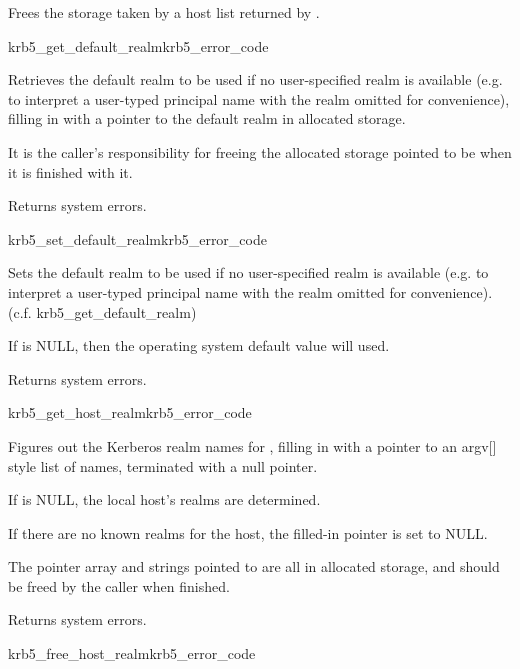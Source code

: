 Frees the storage taken by a host list returned by .

\begin{funcdecl}{krb5_get_default_realm}{krb5_error_code}{\funcin}
\funcout
{}
\end{funcdecl}

Retrieves the default realm to be used if no user-specified realm is
available (e.g. to interpret a user-typed principal name with the
realm omitted for convenience), filling in  with a
pointer to the default realm in allocated storage.

It is the caller's responsibility for freeing the allocated storage
pointed to be  when it is finished with it.

Returns system errors.

\begin{funcdecl}{krb5_set_default_realm}{krb5_error_code}{\funcin}
\end{funcdecl}

Sets the default realm to be used if no user-specified realm is
available (e.g. to interpret a user-typed principal name with the
realm omitted for convenience). (c.f. krb5_get_default_realm)

If  is NULL, then the operating system default value
will used.

Returns system errors.

\begin{funcdecl}{krb5_get_host_realm}{krb5_error_code}{\funcin}
\funcout
{}
\end{funcdecl}

Figures out the Kerberos realm names for , filling in
 with a
pointer to an argv[] style list of names, terminated with a null pointer.
 
If  is NULL, the local host's realms are determined.

If there are no known realms for the host, the filled-in pointer is set
to NULL.

The pointer array and strings pointed to are all in allocated storage,
and should be freed by the caller when finished.

Returns system errors.

\begin{funcdecl}{krb5_free_host_realm}{krb5_error_code}{\funcin}
\end{funcdecl}

